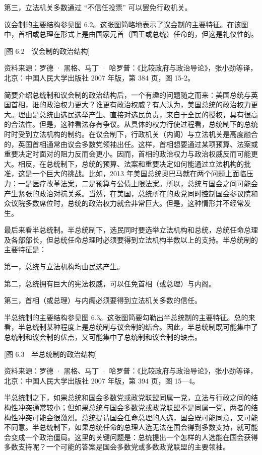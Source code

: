 第三，立法机关多数通过 “不信任投票” 可以罢免行政机关。

议会制的主要结构参见图 6.2。这张图简略地表示了议会制的主要特征。在该图中，首相或总理在形式上是由国家元首（国王或总统）任命的，但这是礼仪性的。

[图 6.2　议会制的政治结构]

资料来源：罗德 · 黑格、马丁 · 哈罗普：《比较政府与政治导论》，张小劲等译，北京：中国人民大学出版社 2007 年版，第 384 页，图 15-2。

简要介绍总统制和议会制的政治结构后，一个有趣的问题随之而来：美国总统与英国首相，谁的政治权力更大？谁更有政治权威？有人认为，美国总统的政治权力更大。理由是总统由选民选举产生、直接对选民负责，来自于全民的授权，具有很高的合法性。但是，这种看法存有争议。从具体的权力行使过程看，总统制下的总统时时受到立法机构的制约。在议会制下，行政机关（内阁）与立法机关是高度融合的，英国首相通常由议会多数党领袖出任。这样，首相想要通过某项预算、法案或重要决定时面对的阻力反而会更小。因而，首相的政治权力与政治权威反而可能更大。相反，在总统制下，总统的预算、法案和重要决定如何能通过立法机构的批准，这是一个巨大的挑战。比如，2013 年美国总统奥巴马就在两个问题上面临压力：一是医疗改革法案，二是预算与公债上限法案。所以，总统与国会之间可能会产生紧张的政治对抗关系。当然，在美国，总统所在的政党同时控制国会参议院和众议院多数席位时，总统的政治权力就会非常巨大。但是，这种情形并不经常发生。

最后来看半总统制。半总统制下，选民同时要选举立法机构和总统，总统任命总理及各部部长，但总统任命总理时必须要得到立法机构半数以上的支持。半总统制的主要特征是：

第一，总统与立法机构均由民选产生。

第二，总统拥有巨大的宪法权威，可以任免首相（或总理）与内阁。

第三，首相（或总理）与内阁必须要得到立法机关多数的信任。

半总统制的主要结构参见图 6.3。这张图简要勾勒出半总统制的主要特征。总的来看，半总统制某种程度上是总统制与议会制的结合。因此，半总统制既可能集中了总统制和议会制的优点，又可能集中了总统制和议会制的缺点。

[图 6.3　半总统制的政治结构]

资料来源：罗德 · 黑格、马丁 · 哈罗普：《比较政府与政治导论》，张小劲等译，北京：中国人民大学出版社 2007 年版，第 394 页，图 15—4。

半总统制之下，如果总统和国会多数党或政党联盟同属一党，立法与行政之间的结构性冲突通常较小；但如果总统与国会多数党或政党联盟不是同属一党，两者的结构性冲突可能会很激烈。总统提请国会任命总理的人选，国会既可能同意，又可能不同意。半总统制下，如果总统任命的总理人选无法在国会得到多数支持，就可能会变成一个政治僵局。这里的关键问题是：总统提出一个怎样的人选能在国会获得多数支持呢？一个可能的答案是国会多数党或多数政党联盟的主要领袖。


